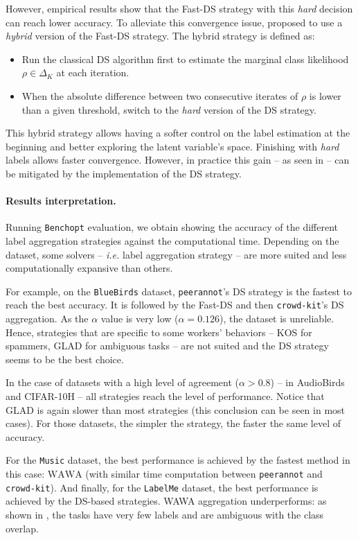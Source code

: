 However, empirical results show that the Fast-DS strategy with this \emph{hard} decision can reach lower accuracy.
To alleviate this convergence issue, \citet{sinha2018fast} proposed to use a \emph{hybrid} version of the Fast-DS strategy.
The hybrid strategy is defined as:
\begin{itemize}
    \item Run the classical DS algorithm first to estimate the marginal class likelihood $\rho\in\Delta_K$ at each iteration.
    \item When the absolute difference between two consecutive iterates of $\rho$ is lower than a given threshold, switch to the \emph{hard} version of the DS strategy.
\end{itemize}
This hybrid strategy allows having a softer control on the label estimation at the beginning and better exploring the latent variable's space.
Finishing with \emph{hard} labels allows faster convergence.
However, in practice this gain -- as seen in  -- can be mitigated by the implementation of the DS strategy.

\paragraph{Results interpretation.}
Running \texttt{Benchopt} evaluation, we obtain  showing the accuracy of the different label aggregation strategies against the computational time.
Depending on the dataset, some solvers -- \emph{i.e.} label aggregation strategy -- are more suited and less computationally expansive than others.

For example, on the \texttt{BlueBirds} dataset, \texttt{peerannot}'s DS strategy is the fastest to reach the best accuracy. It is followed by the Fast-DS and then \texttt{crowd-kit}'s DS aggregation.
As the $\alpha$ value is very low ($\alpha=0.126$), the dataset is unreliable.
Hence, strategies that are specific to some workers' behaviors -- KOS for spammers, GLAD for ambiguous tasks -- are not suited and the DS strategy seems to be the best choice.

In the case of datasets with a high level of agreement ($\alpha>0.8$) -- in AudioBirds and CIFAR-10H -- all strategies reach the level of performance. Notice that GLAD is again slower than most strategies (this conclusion can be seen in most cases). For those datasets, the simpler the strategy, the faster the same level of accuracy.

For the \texttt{Music} dataset, the best performance is achieved by the fastest method in this case: $\mathrm{WAWA}$ (with similar time computation between \texttt{peerannot} and \texttt{crowd-kit}).
And finally, for the \texttt{LabelMe} dataset, the best performance is achieved by the DS-based strategies.
WAWA aggregation underperforms: as shown in , the tasks have very few labels and are ambiguous with the class overlap.

